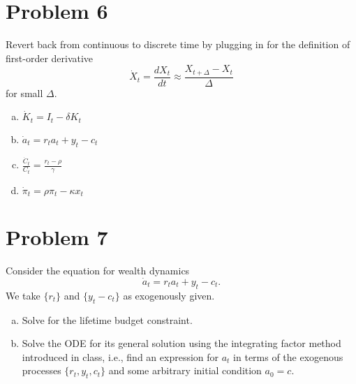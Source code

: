 \documentclass[11pt]{extarticle}
\theoremstyle{plain}
\theoremstyle{definition}
\begin{document}
\vspace{10mm}
\section*{Problem 6}

Revert back from continuous to discrete time by plugging in for the definition of first-order derivative
\begin{equation*}
	\dot X_t = \frac{dX_t}{dt} \approx \frac{X_{t+\Delta} - X_t}{\Delta}
\end{equation*}
for small $\Delta$. 

\begin{enumerate}[(a)]
\item $\dot K_t = I_t - \delta K_t$

\item $\dot a_t = r_t a_t + y_t - c_t$

\item $\frac{\dot C_t}{C_t} = \frac{r_t - \rho}{\gamma}$

\item $\dot \pi_t = \rho \pi_t - \kappa x_t$
\end{enumerate}



\vspace{10mm}
\section*{Problem 7}

Consider the equation for wealth dynamics
\begin{equation*}
	\dot a_t = r_t a_t + y_t - c_t.
\end{equation*}
We take $\{r_t\}$ and $\{y_t - c_t\}$ as exogenously given.

\begin{enumerate}[(a)]
\item Solve for the lifetime budget constraint.

\item Solve the ODE for its general solution using the integrating factor method introduced in class, i.e., find an expression for $a_t$ in terms of the exogenous processes $\{r_t, y_t, c_t\}$ and some arbitrary initial condition $a_0 = c$. 

\end{enumerate}
\end{document}

